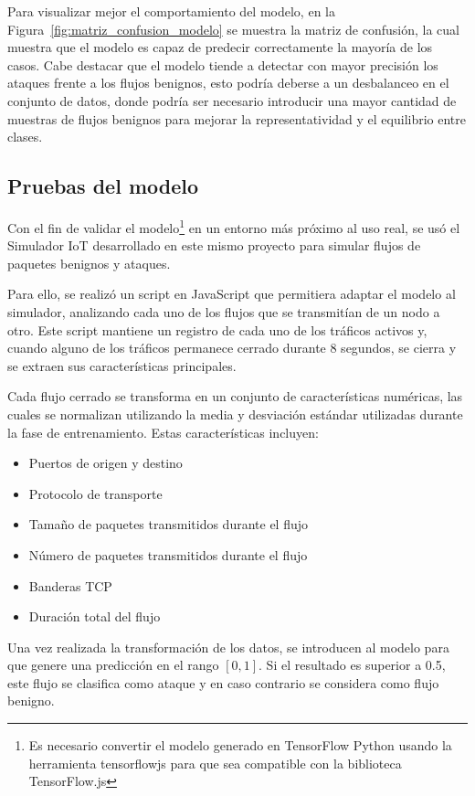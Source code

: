 Para visualizar mejor el comportamiento del modelo, en la Figura~\ref{fig:matriz_confusion_modelo} se muestra la matriz de confusión, la cual muestra que el modelo es capaz de predecir correctamente la mayoría de los casos. Cabe destacar que el modelo tiende a detectar con mayor precisión los ataques frente a los flujos benignos, esto podría deberse a un desbalanceo en el conjunto de datos, donde podría ser necesario introducir una mayor cantidad de muestras de flujos benignos para mejorar la representatividad y el equilibrio entre clases.

\subsection{Pruebas del modelo}
\label{subsec:PruebasModelo}
Con el fin de validar el modelo\footnote{Es necesario convertir el modelo generado en TensorFlow Python usando la herramienta tensorflowjs para que sea compatible con la biblioteca TensorFlow.js} en un entorno más próximo al uso real, se usó el Simulador IoT desarrollado en este mismo proyecto para simular flujos de paquetes benignos y ataques.

Para ello, se realizó un script en JavaScript que permitiera adaptar el modelo al simulador, analizando cada uno de los flujos que se transmitían de un nodo a otro. Este script mantiene un registro de cada uno de los tráficos activos y, cuando alguno de los tráficos permanece cerrado durante 8 segundos, se cierra y se extraen sus características principales.

Cada flujo cerrado se transforma en un conjunto de características numéricas, las cuales se normalizan utilizando la media y desviación estándar utilizadas durante la fase de entrenamiento. Estas características incluyen:
\begin{itemize}
    \item Puertos de origen y destino
    \item Protocolo de transporte
    \item Tamaño de paquetes transmitidos durante el flujo
    \item Número de paquetes transmitidos durante el flujo
    \item Banderas TCP
    \item Duración total del flujo
\end{itemize}
Una vez realizada la transformación de los datos, se introducen al modelo para que genere una predicción en el rango \([0, 1]\). Si el resultado es superior a 0.5, este flujo se clasifica como ataque y en caso contrario se considera como flujo benigno.

